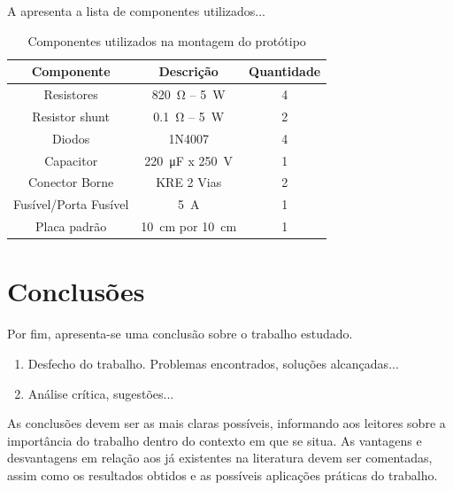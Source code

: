 A  apresenta a lista de componentes utilizados...

\begin{table}[!ht]
	\centering
	\caption{Componentes utilizados na montagem do protótipo}
	\label{tab:componentes}
	\begin{tabular}{@{}ccc@{}}
		\toprule
		\textbf{Componente} & \textbf{Descrição} & \textbf{Quantidade} \\ \midrule
		Resistores          & \SI{820}{\ohm} -- \SI{5}{\W}             & 4                   \\
		Resistor shunt      & \SI{0.1}{\ohm} -- \SI{5}{\W}             & 2                   \\
		Diodos              & 1N4007             & 4                   \\
		Capacitor           & \SI{220}{\micro\farad} x \SI{250}{\V}      & 1                   \\
		Conector Borne      &  KRE 2 Vias    & 2                   \\
		Fusível/Porta Fusível     &  \SI{5}{\A}  & 1                  \\
		Placa padrão        & \SI{10}{\cm} por \SI{10}{\cm}         & 1                   \\ \bottomrule
	\end{tabular}
\end{table}



\section{Conclusões} 

Por fim, apresenta-se uma conclusão sobre o trabalho estudado.
\begin{enumerate}								
	\item  Desfecho do trabalho. Problemas encontrados, soluções alcançadas...
	\item  Análise crítica, sugestões...
\end{enumerate}


As conclusões devem ser as mais claras possíveis, informando aos leitores sobre a importância do trabalho dentro do contexto em que se situa. As vantagens e desvantagens em relação aos já existentes na literatura devem ser comentadas, assim como os resultados obtidos e as possíveis aplicações práticas do trabalho.





\balance


